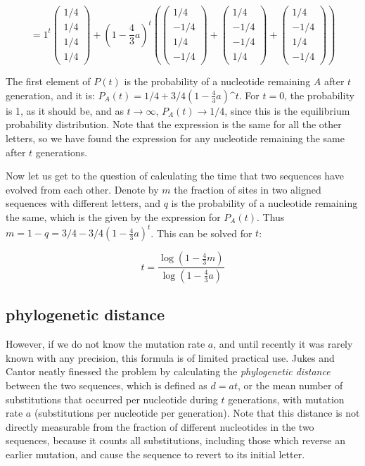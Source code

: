 \documentclass[
  letterpaper,
  DIV=11,
  numbers=noendperiod]{scrreprt}
\begin{document}
\[ = 1^t \left(\begin{array}{c} 1/4 \\ 1/4 \\ 1/4 \\ 1/4 \end{array}\right) + (1-\frac{4}{3}a)^t\left( \left(\begin{array}{c} 1/4 \\ -1/4 \\ 1/4 \\ -1/4 \end{array}\right) +  \left(\begin{array}{c} 1/4 \\ -1/4 \\ -1/4 \\ 1/4 \end{array}\right) + \left(\begin{array}{c} 1/4 \\ -1/4 \\ 1/4 \\ -1/4 \end{array}\right) \right)\]

The first element of \(P(t)\) is the probability of a nucleotide
remaining \(A\) after \(t\) generation, and it is:
\(P_A (t) = 1/4 +3/4(1-\frac{4}{3}a)\^t\). For \(t=0\), the probability
is 1, as it should be, and as \(t \rightarrow \infty\),
\(P_A (t) \rightarrow 1/4\), since this is the equilibrium probability
distribution. Note that the expression is the same for all the other
letters, so we have found the expression for any nucleotide remaining
the same after \(t\) generations.

Now let us get to the question of calculating the time that two
sequences have evolved from each other. Denote by \(m\) the fraction of
sites in two aligned sequences with different letters, and \(q\) is the
probability of a nucleotide remaining the same, which is the given by
the expression for \(P_A(t)\). Thus
\(m = 1 - q = 3/4 - 3/4(1-\frac{4}{3}a)^t\). This can be solved for
\(t\):

\[ t = \frac{\log (1 -  \frac{4}{3} m)}{\log (1 -  \frac{4}{3} a)}\]

\hypertarget{phylogenetic-distance}{%
\subsection{phylogenetic distance}\label{phylogenetic-distance}}

However, if we do not know the mutation rate \(a\), and until recently
it was rarely known with any precision, this formula is of limited
practical use. Jukes and Cantor neatly finessed the problem by
calculating the \emph{phylogenetic distance} between the two sequences,
which is defined as \(d = a t\), or the mean number of substitutions
that occurred per nucleotide during \(t\) generations, with mutation
rate \(a\) (substitutions per nucleotide per generation). Note that this
distance is not directly measurable from the fraction of different
nucleotides in the two sequences, because it counts all substitutions,
including those which reverse an earlier mutation, and cause the
sequence to revert to its initial letter.
\end{document}
